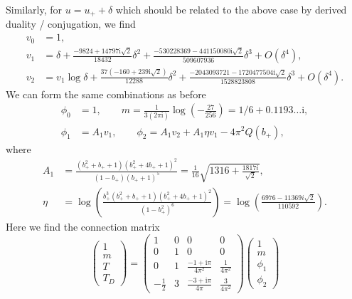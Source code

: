 \documentclass[11pt, a4paper]{article}
\newcommand{\ii}{\mathrm{i}}
\numberwithin{equation}{section}
\begin{document}
Similarly, for $u = u_{+} + \delta$ which should be related to the above case by derived duality / conjugation, we find
\begin{equation}
  \begin{aligned}
    v_0 &= 1, \\
    v_1 &= \delta
      + \frac{-9824 + 14797 \ii \sqrt{2}}{18432} \delta^2
      + \frac{-530228369 - 441150080 \ii \sqrt{2}}{509607936} \delta^3
      + O(\delta^4), \\
    v_2 &= v_1 \log \delta +
      \frac{37(-160 + 239 \ii \sqrt{2})}{12288} \delta^2
      + \frac{-2043093721 - 1720477504 \ii \sqrt{2}}{1528823808} \delta^3
      + O(\delta^4).
  \end{aligned}
\end{equation}
We can form the same combinations as before
\begin{equation}
  \begin{aligned}
    \phi_0 &= 1, \qquad m = \frac{1}{3 (2\pi \ii)}\log\left( -\frac{27}{256} \right) = 1/6 + 0.1193\dots \ii, \\
    \phi_1 &= A_1 v_1, \qquad \phi_2 = A_1 v_2 + A_1 \eta v_1 -4 \pi ^2 Q(b_{+}),
  \end{aligned}
\end{equation}
where
\begin{equation}
  \begin{aligned}
    A_1 &= \frac{\left(b_{+}^2+b_{+}+1\right) \left(b_{+}^2+4 b_{+}+1\right)^2}{(1-b_{+}) (b_{+}+1)^5} = \frac{1}{16} \sqrt{1316+\frac{1817 i}{\sqrt{2}}}, \\
    \eta &= \log \left(\frac{b_{+}^3 \left(b_{+}^2+b_{+}+1\right) \left(b_{+}^2+4 b_{+}+1\right)^2}{\left(1-b_{+}^2\right)^6}\right) = \log \left(\frac{6976-11369 i \sqrt{2}}{110592}\right).
  \end{aligned}
\end{equation}
Here we find the connection matrix
\begin{equation}
  \begin{pmatrix}
1 \\[2pt]
m \\[2pt]
T \\[2pt]
T_D
\end{pmatrix}
=
\begin{pmatrix}
1 & 0 & 0 & 0 \\
0 & 1 & 0 & 0 \\
0 & 1 & \frac{-1+\ii\pi}{4\pi^2} & \frac{1}{4\pi^2} \\
-\frac{1}{2} & 3 & \frac{-3+\ii\pi}{4\pi} & \frac{3}{4\pi^2}
\end{pmatrix}
\begin{pmatrix}
1 \\[2pt]
m \\[2pt]
\phi_1 \\[2pt]
\phi_2
\end{pmatrix}
\end{equation}
\end{document}
